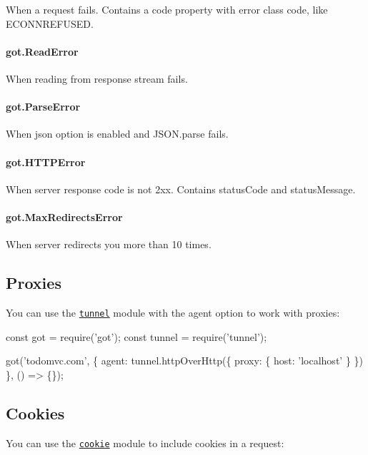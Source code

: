 When a request fails. Contains a {\ttfamily code} property with error class code, like {\ttfamily E\+C\+O\+N\+N\+R\+E\+F\+U\+S\+ED}.

\paragraph*{got.\+Read\+Error}

When reading from response stream fails.

\paragraph*{got.\+Parse\+Error}

When {\ttfamily json} option is enabled and {\ttfamily J\+S\+O\+N.\+parse} fails.

\paragraph*{got.\+H\+T\+T\+P\+Error}

When server response code is not 2xx. Contains {\ttfamily status\+Code} and {\ttfamily status\+Message}.

\paragraph*{got.\+Max\+Redirects\+Error}

When server redirects you more than 10 times.

\subsection*{Proxies}

You can use the \href{https://github.com/koichik/node-tunnel}{\tt {\ttfamily tunnel}} module with the {\ttfamily agent} option to work with proxies\+:


\begin{DoxyCode}
const got = require('got');
const tunnel = require('tunnel');

got('todomvc.com', \{
    agent: tunnel.httpOverHttp(\{
        proxy: \{
            host: 'localhost'
        \}
    \})
\}, () => \{\});
\end{DoxyCode}


\subsection*{Cookies}

You can use the \href{https://github.com/jshttp/cookie}{\tt {\ttfamily cookie}} module to include cookies in a request\+:


